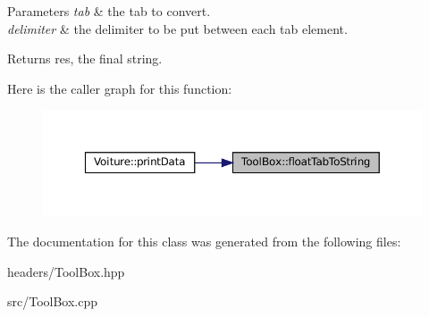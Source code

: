 \begin{DoxyParams}{Parameters}
{\em tab} & the tab to convert. \\
\hline
{\em delimiter} & the delimiter to be put between each tab element. \\
\hline
\end{DoxyParams}
\begin{DoxyReturn}{Returns}
res, the final string. 
\end{DoxyReturn}
Here is the caller graph for this function\+:
\nopagebreak
\begin{figure}[H]
\begin{center}
\leavevmode
\includegraphics[width=350pt]{class_tool_box_a268881f9f0d13d7bf048b7c647376e65_icgraph}
\end{center}
\end{figure}


The documentation for this class was generated from the following files\+:\begin{DoxyCompactItemize}
\item 
headers/Tool\+Box.\+hpp\item 
src/Tool\+Box.\+cpp\end{DoxyCompactItemize}
